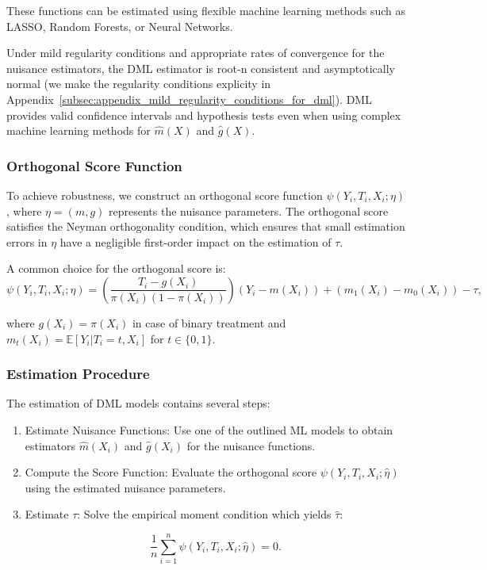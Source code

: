 \documentclass{article}
\numberwithin{equation}{section}
\begin{document}
These functions can be estimated using flexible machine learning methods such as LASSO, Random Forests, or Neural Networks.

Under mild regularity conditions and appropriate rates of convergence for the nuisance estimators, the DML estimator is root-n consistent and asymptotically normal (we make the regularity conditions explicity in Appendix~\ref{subsec:appendix_mild_regularity_conditions_for_dml}). DML provides valid confidence intervals and hypothesis tests even when using complex machine learning methods for $\hat{m}(X)$ and $\hat{g}(X)$.

\subsubsection{Orthogonal Score Function}

To achieve robustness, we construct an orthogonal score function $\psi(Y_i, T_i, X_i; \eta)$, where $\eta = (m, g)$ represents the nuisance parameters. The orthogonal score satisfies the Neyman orthogonality condition, which ensures that small estimation errors in $\eta$ have a negligible first-order impact on the estimation of $\tau$.

A common choice for the orthogonal score is:
\begin{equation}
\psi(Y_i, T_i, X_i; \eta) = \left( \frac{T_i - g(X_i)}{\pi(X_i)(1 - \pi(X_i))} \right) (Y_i - m(X_i)) + \left( m_1(X_i) - m_0(X_i) \right) - \tau,
\label{eq:orthogonal_score}
\end{equation}

where $g(X_i) = \pi(X_i)$ in case of binary treatment and $m_t(X_i) = \mathbb{E}[Y_i | T_i = t, X_i]$ for $t \in \{0,1\}$.

\subsubsection{Estimation Procedure}

The estimation of DML models contains several steps:
\begin{enumerate}[label=\roman*.]
\item Estimate Nuisance Functions: Use one of the outlined ML models to obtain estimators $\hat{m}(X_i)$ and $\hat{g}(X_i)$ for the nuisance functions.

\item Compute the Score Function: Evaluate the orthogonal score $\psi(Y_i, T_i, X_i; \hat{\eta})$ using the estimated nuisance parameters.

\item Estimate $\tau$: Solve the empirical moment condition which yields $\hat{\tau}$:

\begin{equation}
\frac{1}{n} \sum_{i=1}^n \psi(Y_i, T_i, X_i; \hat{\eta}) = 0.
\label{eq:orthogonal_score_psi}
\end{equation}
\end{enumerate}
\end{document}
